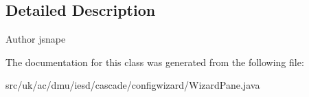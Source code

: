 \subsection{Detailed Description}
\begin{DoxyAuthor}{Author}
jsnape 
\end{DoxyAuthor}


The documentation for this class was generated from the following file\-:\begin{DoxyCompactItemize}
\item 
src/uk/ac/dmu/iesd/cascade/configwizard/Wizard\-Pane.\-java\end{DoxyCompactItemize}
